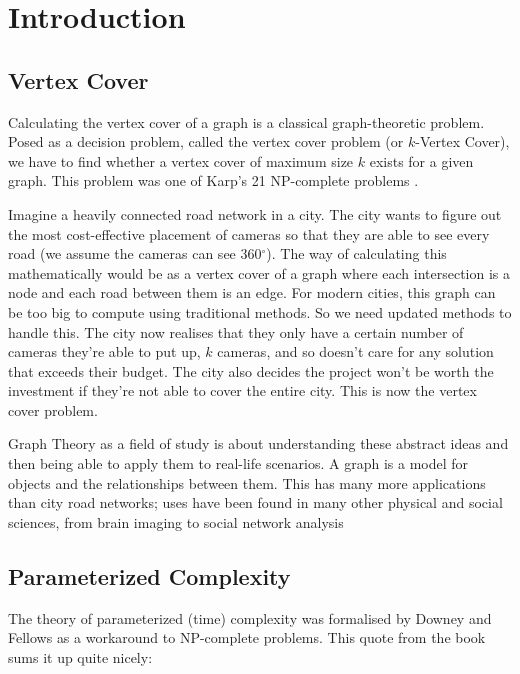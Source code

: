 \section{Introduction}

\subsection{Vertex Cover}

Calculating the vertex cover of a graph is a classical graph-theoretic problem.
Posed as a decision problem, called the vertex cover problem (or \(k\)-Vertex
Cover), we have to find whether a vertex cover of maximum size \(k\) exists for
a given graph. This problem was one of Karp's 21 NP-complete problems
\cite{karp1972reducibility}.

Imagine a heavily connected road network in a city. The city wants to figure
out the most cost-effective placement of cameras so that they are able to see
every road (we assume the cameras can see 360\(^\circ\)). The way of
calculating this mathematically would be as a vertex cover of a graph where
each intersection is a node and each road between them is an edge. For modern
cities, this graph can be too big to compute using traditional methods. So we
need updated methods to handle this. The city now realises that they only have
a certain number of cameras they're able to put up, \(k\) cameras, and so
doesn't care for any solution that exceeds their budget. The city also decides
the project won't be worth the investment if they're not able to cover the
entire city. This is now the vertex cover problem.

Graph Theory as a field of study is about understanding these abstract ideas
and then being able to apply them to real-life scenarios. A graph is a model
for objects and the relationships between them. This has many more applications
than city road networks; uses have been found in many other physical and social
sciences, from brain imaging \cite{vecchio2016brain} to social network analysis
\cite{grandjean2016social}

\subsection{Parameterized Complexity}

The theory of parameterized (time) complexity was formalised by Downey and
Fellows \cite{downey1999parameterized} as a workaround to NP-complete problems.
This quote from the book sums it up quite nicely:

